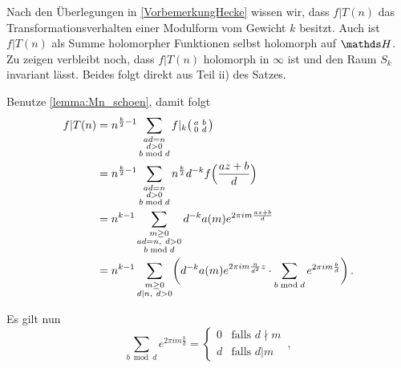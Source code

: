 \begin{bewe-list}
\item Nach den Überlegungen in \autoref{VorbemerkungHecke} wissen wir, dass $f | T(n)$ das Transformationsverhalten einer Modulform vom Gewicht $k$ besitzt. Auch ist $f | T(n)$ als Summe holomorpher Funktionen selbst holomorph auf $\HH$. Zu zeigen verbleibt noch, dass $f | T(n)$ holomorph in $\infty$ ist und den Raum $S_k$ invariant lässt. Beides folgt direkt aus Teil ii) des Satzes.

\item Benutze \autoref{lemma:Mn_schoen}, damit folgt
\begin{align*}
f|T(n)
&= n^{\frac{k}{2}-1} \sum_{\substack{ad=n\\ d>0 \\ b\bmod d}} f|_k \mymat ab0d \\
&= n^{\frac{k}{2}-1} \sum_{\substack{ad=n\\ d>0 \\ b\bmod d}} n^{\frac{k}{2}} d^{-k} f\Bigl(\frac{az+b}{d}\Bigr) \\
&= n^{k-1} \sum_{\substack{m \geq 0\\ ad=n,\ d>0\\ b\bmod d}} d^{-k} a(m) e^{2\pi im \frac{az+b}{d}} \\
&= n^{k-1} \sum_{\substack{m \geq 0\\ d|n,\ d>0}} \biggl( d^{-k} a(m) e^{2\pi im \frac{n}{d^2}z} \cdot \sum_{b\bmod d} e^{2\pi im \frac{b}{d}}\biggr)
\,.
\end{align*}

Es gilt nun
\[
\sum_{b \bmod d} e^{2\pi im \frac{b}{d}}
= \begin{cases}
0 & \text{falls } d\nmid m \\
d & \text{falls } d| m
\end{cases}
\,,
\]


\end{bewe-list}
